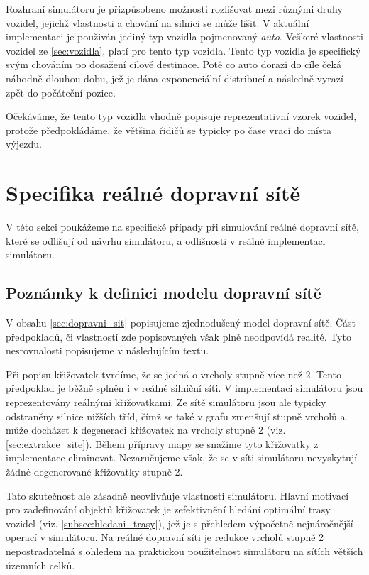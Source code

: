 Rozhraní simulátoru je přizpůsobeno možnosti rozlišovat mezi různými druhy 
vozidel, jejichž vlastnosti a chování na silnici se může lišit. V aktuální 
implementaci je použiván jediný typ vozidla pojmenovaný \emph{auto}.
Veškeré vlastnosti vozidel ze \cref{sec:vozidla}, platí pro tento typ
vozidla. Tento typ vozidla je specifický svým chováním po dosažení cílové 
destinace. Poté co auto dorazí do cíle čeká náhodně dlouhou dobu, jež je dána 
exponenciální distribucí a následně vyrazí zpět do počáteční pozice.

Očekáváme, že tento typ vozidla vhodně popisuje reprezentativní vzorek
vozidel, protože předpokládáme, že většina řidičů se typicky po čase vrací do místa
výjezdu. 


\section{Specifika reálné dopravní sítě}

V této sekci poukážeme na specifické případy při simulování reálné dopravní sítě,
které se odlišují od návrhu simulátoru, a odlišnosti v reálné implementaci simulátoru.

\subsection{Poznámky k definici modelu dopravní sítě}
\label{subsec:problemy_modelu}

V obsahu \cref{sec:dopravni_sit} popisujeme zjednodušený model dopravní sítě. Část
předpokladů, či vlastností zde popisovaných však plně neodpovídá realitě. Tyto
nesrovnalosti popisujeme v následujícím textu. 

Při popisu křižovatek tvrdíme, že se jedná o vrcholy stupně více než 2. 
Tento předpoklad je běžně
splněn i v reálné silniční síti. V implementaci simulátoru jsou reprezentovány reálnými 
křižovatkami. Ze sítě simulátoru jsou ale typicky odstraněny silnice nižších tříd, čímž
se také v grafu zmenšují stupně vrcholů a může docházet k degeneraci křižovatek
na vrcholy stupně 2 (viz. \cref{sec:extrakce_site}). Během přípravy mapy se 
snažíme tyto křižovatky z implementace eliminovat. Nezaručujeme však, že se v síti 
simulátoru nevyskytují žádné degenerované křižovatky stupně 2. 

Tato skutečnost ale zásadně neovlivňuje vlastnosti simulátoru. Hlavní motivací pro
zadefinování objektů křižovatek je zefektivnění hledání optimální trasy vozidel
(viz. \cref{subsec:hledani_trasy}), jež je s přehledem výpočetně nejnáročnější 
operací v simulátoru. Na reálné dopravní síti je redukce vrcholů stupně 2 
nepostradatelná s ohledem na praktickou použitelnost simulátoru na sítích větších 
územních celků.

